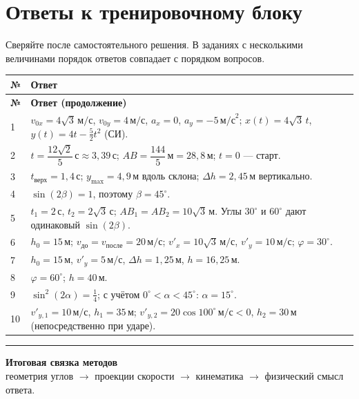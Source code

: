 \documentclass[a4paper,12pt]{article}
\newcommand{\separate}{\par\vspace{0.25em}\noindent\color{accent}\rule{\linewidth}{0.5pt}\color{black}\par\vspace{0.25em}}
\newcommand{\secstyle}[1]{\section*{\textcolor{darkaccent}{#1}}}
\newcommand{\tagline}[1]{\begin{center}\small\color{softgray}#1\end{center}}
\begin{document}
\clearpage
\secstyle{Ответы к тренировочному блоку}
\tagline{Сверяйте после самостоятельного решения. В заданиях с несколькими величинами порядок ответов совпадает с порядком вопросов.}
\renewcommand{\arraystretch}{1.45}
\small
\begin{longtable}{@{}p{.065\linewidth}p{.87\linewidth}@{}}
\toprule
\textbf{№} & \textbf{Ответ}\\
\midrule
\endfirsthead
\toprule
\textbf{№} & \textbf{Ответ (продолжение)}\\
\midrule
\endhead
1 & \(v_{0x}=4\sqrt3\,\text{м/с}\), \(v_{0y}=4\,\text{м/с}\), \(a_x=0\), \(a_y=-5\,\text{м/с}^2\); \(x(t)=4\sqrt3\,t\), \(y(t)=4t-\tfrac52t^2\) (СИ).\\
2 & \(t=\dfrac{12\sqrt2}{5}\,\text{с}\approx3{,}39\,\text{с}\); \(AB=\dfrac{144}{5}\,\text{м}=28{,}8\,\text{м}\); \(t=0\) --- старт.\\
3 & \(t_{\text{верх}}=1{,}4\,\text{с}\); \(y_{\max}=4{,}9\,\text{м}\) вдоль склона; \(\Delta h=2{,}45\,\text{м}\) вертикально.\\
4 & \(\sin(2\beta)=1\), поэтому \(\beta=45^\circ\).\\
5 & \(t_1=2\,\text{с}\), \(t_2=2\sqrt3\,\text{с}\); \(AB_1=AB_2=10\sqrt3\,\text{м}\). Углы \(30^\circ\) и \(60^\circ\) дают одинаковый \(\sin(2\beta)\).\\
6 & \(h_0=15\,\text{м}\); \(v_{\text{до}}=v_{\text{после}}=20\,\text{м/с}\); \(v'_x=10\sqrt3\,\text{м/с}\), \(v'_y=10\,\text{м/с}\); \(\varphi=30^\circ\).\\
7 & \(h_0=15\,\text{м}\), \(v'_y=5\,\text{м/с}\), \(\Delta h=1{,}25\,\text{м}\), \(h=16{,}25\,\text{м}\).\\
8 & \(\varphi=60^\circ\); \(h=40\,\text{м}\).\\
9 & \(\sin^2(2\alpha)=\tfrac14\); с учётом \(0^\circ<\alpha<45^\circ\): \(\alpha=15^\circ\).\\
10 & \(v'_{y,1}=10\,\text{м/с}\), \(h_1=35\,\text{м}\); \(v'_{y,2}=20\cos100^\circ\,\text{м/с}<0\), \(h_2=30\,\text{м}\) (непосредственно при ударе).\\
\bottomrule
\end{longtable}
\normalsize
\separate
\begin{center}
\textcolor{darkaccent}{\textbf{Итоговая связка методов}}\\[3pt]
геометрия углов $\longrightarrow$ проекции скорости $\longrightarrow$ кинематика $\longrightarrow$ физический смысл ответа.
\end{center}
\end{document}
